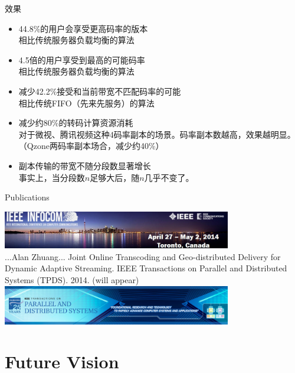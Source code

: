 \documentclass{beamer}
\begin{document}
\begin{frame}{效果}
\begin{itemize}
\item 44.8\%的用户会享受更高码率的版本\\
	相比传统服务器负载均衡的算法
\item 4.5倍的用户享受到最高的可能码率\\
	相比传统服务器负载均衡的算法
\item 减少42.2\%接受和当前带宽不匹配码率的可能\\
	相比传统FIFO（先来先服务）的算法
\item 减少约80\%的转码计算资源消耗\\
	对于微视、腾讯视频这种4码率副本的场景。码率副本数越高，效果越明显。（Qzone两码率副本场合，减少约40\%）
\item 副本传输的带宽不随分段数显著增长\\
	事实上，当分段数$n$足够大后，随$n$几乎不变了。
\end{itemize}
\end{frame}
\begin{frame}{Publications}
\begin{center}
\includegraphics[width=10cm]{fig/infocom.jpg}\\\pause
...Alan Zhuang... Joint Online Transcoding and Geo-distributed Delivery for Dynamic Adaptive Streaming. IEEE Transactions on Parallel and Distributed Systems (TPDS). 2014. (will appear)\\\pause
\includegraphics[width=10cm]{fig/tpds_25yr.jpg}\\\pause
\end{center}
\end{frame}

\section{Future Vision}
\end{document}
